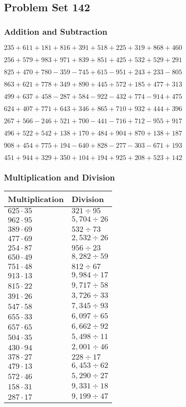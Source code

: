 \hypertarget{problem-set-142}{%
\subsection{Problem Set 142}\label{problem-set-142}}

\hypertarget{addition-and-subtraction}{%
\subsubsection{Addition and
Subtraction}\label{addition-and-subtraction}}

\(235 +611 +181 +816 +391 +518 +225 +319 +868 +460\)

\(256 +579 +983 +971 +839 +851 +425 +532 +529 +291\)

\(825 +470 +780 - 359 - 745 +615 - 951 +243 +233 - 805\)

\(863 +621 +778 +349 +890 +445 +572 +185 +477 +313\)

\(499 +637 +458 - 287 +584 - 922 - 432 +774 - 914 +475\)

\(624 +407 +771 +643 +346 +865 +710 +932 +444 +396\)

\(267 +566 - 246 +521 +700 - 441 - 716 +712 - 955 +917\)

\(496 +522 +542 +138 +170 +484 +904 +870 +138 +187\)

\(908 +454 +775 +194 - 640 +828 - 277 - 303 - 671 +193\)

\(451 +944 +329 +350 +104 +194 +925 +208 +523 +142\)

\hypertarget{multiplication-and-division}{%
\subsubsection{Multiplication and
Division}\label{multiplication-and-division}}

\begin{longtable}[]{@{}ll@{}}
\toprule
Multiplication & Division\tabularnewline
\midrule
\endhead
\(625 \cdot 35\) & \(321÷95\)\tabularnewline
\(962 \cdot 95\) & \(5,704÷26\)\tabularnewline
\(389 \cdot 69\) & \(532÷73\)\tabularnewline
\(477 \cdot 69\) & \(2,532÷26\)\tabularnewline
\(254 \cdot 87\) & \(956÷23\)\tabularnewline
\(650 \cdot 49\) & \(8,282÷59\)\tabularnewline
\(751 \cdot 48\) & \(812÷67\)\tabularnewline
\(913 \cdot 13\) & \(9,984÷17\)\tabularnewline
\(815 \cdot 22\) & \(9,717÷58\)\tabularnewline
\(391 \cdot 26\) & \(3,726÷33\)\tabularnewline
\(547 \cdot 58\) & \(7,345÷93\)\tabularnewline
\(655 \cdot 33\) & \(6,097÷65\)\tabularnewline
\(657 \cdot 65\) & \(6,662÷92\)\tabularnewline
\(504 \cdot 35\) & \(5,498÷11\)\tabularnewline
\(430 \cdot 94\) & \(2,001÷46\)\tabularnewline
\(378 \cdot 27\) & \(228÷17\)\tabularnewline
\(479 \cdot 13\) & \(6,453÷62\)\tabularnewline
\(572 \cdot 46\) & \(5,290÷27\)\tabularnewline
\(158 \cdot 31\) & \(9,331÷18\)\tabularnewline
\(287 \cdot 17\) & \(9,199÷47\)\tabularnewline
\bottomrule
\end{longtable}
